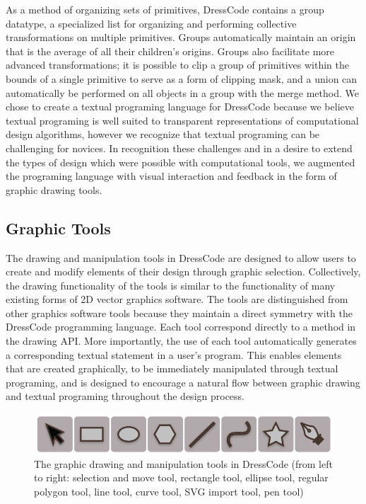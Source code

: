 \documentclass{sigchi}
\begin{document}
As a method of organizing sets of primitives, DressCode contains a group datatype, a specialized list for organizing and performing collective transformations on multiple primitives. Groups automatically maintain an origin that is the average of all their children's origins. Groups also facilitate more advanced transformations; it is possible to clip a group of primitives within the bounds of a single primitive to serve as a form of clipping mask, and a union can automatically be performed on all objects in a group with the merge method. We chose to create a textual programing language for DressCode because we believe textual programing is well suited to transparent representations of computational design algorithms, however we recognize that textual programing can be challenging for novices. In recognition these challenges and in a desire to extend the types of design which were possible with computational tools, we augmented the programing language with visual interaction and feedback in the form of graphic drawing tools.
 
\subsection{Graphic Tools}
\label{subsec:graphic_tools_test}
The drawing and manipulation tools in DressCode are designed to allow users to create and modify elements of their design through graphic selection. Collectively, the drawing functionality of the tools is similar to the functionality of many existing forms of  2D vector graphics software. The tools are distinguished from other graphics software tools because they maintain a direct symmetry with the DressCode programming language. Each tool correspond directly to a method in the drawing API. More importantly, the use of each tool automatically generates a corresponding textual statement in a user's program. This enables elements that are created graphically, to be immediately manipulated through textual programing, and is designed to encourage a natural flow between graphic drawing and textual programing throughout the design process. 

\begin{center}
\begin{figure}[h!]
\includegraphics[width=\columnwidth]{images/graphic_tools.jpg}
\caption{The graphic drawing and manipulation tools in DressCode (from left to right: selection and move tool, rectangle tool, ellipse tool, regular polygon tool, line tool, curve tool, SVG import tool, pen tool)}
\label{fig:graphic_tools}
\end{figure}
\end{center}
\vspace{-20pt}
\end{document}

